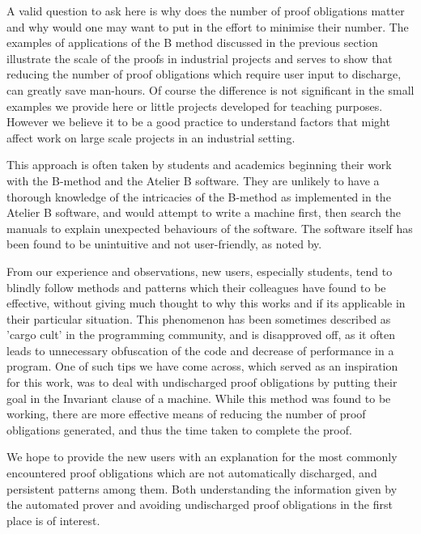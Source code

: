 \documentclass[11pt,journal]{IEEEtran}
\begin{document}
	A valid question to ask here is why does the number of proof obligations matter and why would one may want to put in the effort to minimise their number. The examples of applications of the B method discussed in the previous section illustrate the scale of the proofs in industrial projects and serves to show that reducing the number of proof obligations which require user input to discharge, can greatly save man-hours. Of course the difference is not significant in the small examples we provide here or little projects developed for teaching purposes. However we believe it to be a good practice to understand factors that might affect work on large scale projects in an industrial setting.
	
	This approach is often taken by students and academics beginning their work with the B-method and the Atelier B software. They are unlikely to have a thorough knowledge of the intricacies of the B-method as implemented in the Atelier B software, and would attempt to write a machine first, then search the manuals to explain unexpected behaviours of the software. The software itself has been found to be unintuitive and not user-friendly, as noted by\cite{San Juan metro}.
	
	From our experience and observations, new users, especially students, tend to blindly follow methods and patterns which their colleagues have found to be effective, without giving much thought to why this works and if its applicable in their particular situation. This phenomenon has been sometimes described as 'cargo cult' in the programming community\cite{Cargo culting}, and is disapproved off, as it often leads to unnecessary obfuscation of the code and decrease of performance in a program. One of such tips we have come across, which served as an inspiration for this work, was to deal with undischarged proof obligations by putting their goal in the Invariant clause of a machine. While this method was found to be working, there are more effective means of reducing the number of proof obligations generated, and thus the time taken to complete the proof.
	
	We hope to provide the new users with an explanation for the most commonly encountered proof obligations which are not automatically discharged, and persistent patterns among them. Both understanding the information given by the automated prover and avoiding undischarged proof obligations in the first place is of interest.
	
\end{document}

